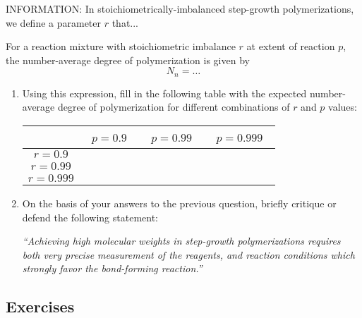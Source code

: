 	INFORMATION: In stoichiometrically-imbalanced step-growth polymerizations, we define a parameter $r$ that...
	
	For a reaction mixture with stoichiometric imbalance $r$ at extent of reaction $p$, the number-average degree of polymerization is given by
	\begin{equation*}
		N_n = \dots
	\end{equation*}
	
	\begin{enumerate}[resume]
		\item Using this expression, fill in the following table with the expected number-average degree of polymerization for different combinations of $r$ and $p$ values:
		
			\begin{table}[!h]
				\centering
				\renewcommand{\arraystretch}{3}
				\begin{tabular}{|c|c|c|c|}
					\hline
					 &  ~$p=0.9$~ & ~$p=0.99$~ & ~$p=0.999$~ \\\hline
					$r=0.9$ &&& \\\hline
					$r=0.99$ &&& \\\hline
					$r=0.999$ &&& \\\hline
				\end{tabular}
			\end{table}
		
		\item On the basis of your answers to the previous question, briefly critique or defend the following statement:
		
			\emph{``Achieving high molecular weights in step-growth polymerizations requires both very precise measurement of the reagents, and reaction conditions which strongly favor the bond-forming reaction.''}
			
	\end{enumerate}

\subsection{Exercises}

	
	
